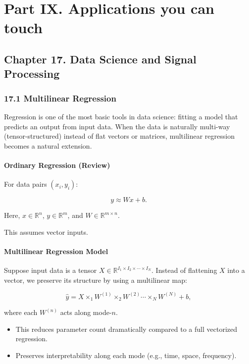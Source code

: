 \documentclass[
  letterpaper,
  DIV=11,
  numbers=noendperiod]{scrreprt}
\providecommand{\tightlist}{%
  \setlength{\itemsep}{0pt}\setlength{\parskip}{0pt}}
\begin{document}
\chapter{Part IX. Applications you can
touch}\label{part-ix.-applications-you-can-touch}

\section{Chapter 17. Data Science and Signal
Processing}\label{chapter-17.-data-science-and-signal-processing}

\subsection{17.1 Multilinear Regression}\label{multilinear-regression}

Regression is one of the most basic tools in data science: fitting a
model that predicts an output from input data. When the data is
naturally multi-way (tensor-structured) instead of flat vectors or
matrices, multilinear regression becomes a natural extension.

\subsubsection{Ordinary Regression
(Review)}\label{ordinary-regression-review}

For data pairs \((x_i, y_i)\):

\[
y \approx Wx + b.
\]

Here, \(x \in \mathbb{R}^n\), \(y \in \mathbb{R}^m\), and
\(W \in \mathbb{R}^{m \times n}\).

This assumes vector inputs.

\subsubsection{Multilinear Regression
Model}\label{multilinear-regression-model}

Suppose input data is a tensor
\(X \in \mathbb{R}^{I_1 \times I_2 \times \cdots \times I_N}\). Instead
of flattening \(X\) into a vector, we preserve its structure by using a
multilinear map:

\[
\hat{y} = X \times_1 W^{(1)} \times_2 W^{(2)} \cdots \times_N W^{(N)} + b,
\]

where each \(W^{(n)}\) acts along mode-\(n\).

\begin{itemize}
\tightlist
\item
  This reduces parameter count dramatically compared to a full
  vectorized regression.
\item
  Preserves interpretability along each mode (e.g., time, space,
  frequency).
\end{itemize}
\end{document}
